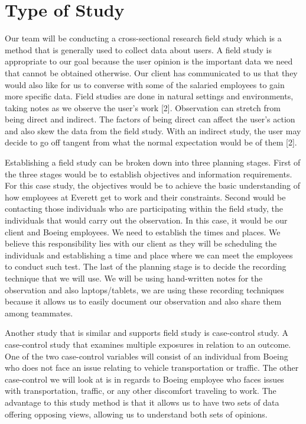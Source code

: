 \documentclass[onecolumn, draftclsnofoot,10pt, compsoc]{IEEEtran}
\begin{document}
\section{Type of Study}
\indent \indent Our team will be conducting a cross-sectional research field study which is a method that is generally used to collect data about users. 
A field study is appropriate to our goal because the user opinion is the important data we need that cannot be obtained otherwise. 
Our client has communicated to us that they would also like for us to converse with some of the salaried employees to gain more specific data. 
Field studies are done in natural settings and environments, taking notes as we observe the user's work [2]. 
Observation can stretch from being direct and indirect. 
The factors of being direct can affect the user's action and also skew the data from the field study. 
With an indirect study, the user may decide to go off tangent from what the normal expectation would be of them [2]. 


Establishing a field study can be broken down into three planning stages. 
First of the three stages would be to establish objectives and information requirements. 
For this case study, the objectives would be to achieve the basic understanding of how employees at Everett get to work and their constraints. 
Second would be contacting those individuals who are participating within the field study, the individuals that would carry out the observation. 
In this case, it would be our client and Boeing employees. We need to establish the times and places. 
We believe this responsibility lies with our client as they will be scheduling the individuals and establishing a time and place where we can meet the employees to conduct such test. 
The last of the planning stage is to decide the recording technique that we will use. 
We will be using hand-written notes for the observation and also laptops/tablets, we are using these recording techniques because it allows us to easily document our observation and also share them among teammates. 


Another study that is similar and supports field study is case-control study. 
A case-control study that examines multiple exposures in relation to an outcome. 
One of the two case-control variables will consist of an individual from Boeing who does not face an issue relating to vehicle transportation or traffic. 
The other case-control we will look at is in regards to Boeing employee who faces issues with transportation, traffic, or any other discomfort traveling to work. 
The advantage to this study method is that it allows us to have two sets of data offering opposing views, allowing us to understand both sets of opinions. 
\end{document}
